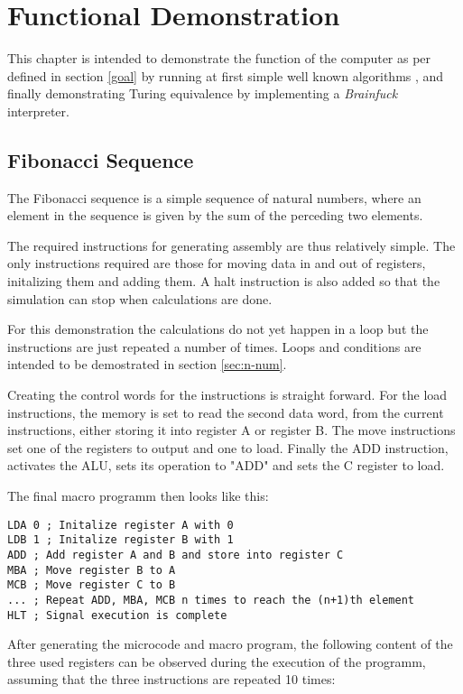\chapter{Functional Demonstration}
This chapter is intended to demonstrate the function of the computer as per defined in section \ref{goal} by running at first simple well known algorithms \cite{chatgptalgoidea}, and finally demonstrating Turing equivalence by implementing a \textit{Brainfuck} interpreter. %




\section{Fibonacci Sequence}
The Fibonacci sequence is a simple sequence of natural numbers, where an element in the sequence is given by the sum of the perceding two elements.

The required instructions for generating assembly are thus relatively simple. The only instructions required are those for moving data in and out of registers, initalizing them and adding them. A halt instruction is also added so that the simulation can stop when calculations are done. 

For this demonstration the calculations do not yet happen in a loop but the instructions are just repeated a number of times. Loops and conditions are intended to be demostrated in section \ref{sec:n-num}.

Creating the control words for the instructions is straight forward. For the load instructions, the memory is set to read the second data word, from the current instructions, either storing it into register A or register B. The move instructions set one of the registers to output and one to load. Finally the ADD instruction, activates the ALU, sets its operation to "ADD" and sets the C register to load. 

The final macro programm then looks like this: 
\begin{lstlisting}[language={[x86masm]Assembler}, caption=Assembly code to calculate assembly, label=lst:fib]
LDA 0 ; Initalize register A with 0
LDB 1 ; Initalize register B with 1
ADD ; Add register A and B and store into register C
MBA ; Move register B to A
MCB ; Move register C to B
... ; Repeat ADD, MBA, MCB n times to reach the (n+1)th element
HLT ; Signal execution is complete
\end{lstlisting}

After generating the microcode and macro program, the following content of the three used registers can be observed during the execution of the programm, assuming that the three instructions are repeated 10 times:

